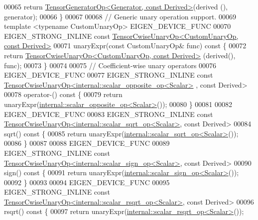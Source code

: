 \begin{DoxyCode}
00065       \textcolor{keywordflow}{return} \hyperlink{class_eigen_1_1_tensor_generator_op}{TensorGeneratorOp<Generator, const Derived>}(derived
      (), generator);
00066     \}
00067 
00068     \textcolor{comment}{// Generic unary operation support.}
00069     \textcolor{keyword}{template} <\textcolor{keyword}{typename} CustomUnaryOp> EIGEN\_DEVICE\_FUNC
00070     EIGEN\_STRONG\_INLINE \textcolor{keyword}{const} \hyperlink{class_eigen_1_1_tensor_cwise_unary_op}{TensorCwiseUnaryOp<CustomUnaryOp, const Derived>}
00071     unaryExpr(\textcolor{keyword}{const} CustomUnaryOp& func)\textcolor{keyword}{ const }\{
00072       \textcolor{keywordflow}{return} \hyperlink{class_eigen_1_1_tensor_cwise_unary_op}{TensorCwiseUnaryOp<CustomUnaryOp, const Derived>}
      (derived(), func);
00073     \}
00074 
00075     \textcolor{comment}{// Coefficient-wise unary operators}
00076     EIGEN\_DEVICE\_FUNC
00077     EIGEN\_STRONG\_INLINE \textcolor{keyword}{const} 
      \hyperlink{class_eigen_1_1_tensor_cwise_unary_op}{TensorCwiseUnaryOp<internal::scalar\_opposite\_op<Scalar>}
      , \textcolor{keyword}{const} Derived>
00078     operator-()\textcolor{keyword}{ const }\{
00079       \textcolor{keywordflow}{return} unaryExpr(\hyperlink{struct_eigen_1_1internal_1_1scalar__opposite__op}{internal::scalar\_opposite\_op<Scalar>}());
00080     \}
00081 
00082     EIGEN\_DEVICE\_FUNC
00083     EIGEN\_STRONG\_INLINE \textcolor{keyword}{const} 
      \hyperlink{class_eigen_1_1_tensor_cwise_unary_op}{TensorCwiseUnaryOp<internal::scalar\_sqrt\_op<Scalar>}, \textcolor{keyword}{
      const} Derived>
00084     sqrt()\textcolor{keyword}{ const }\{
00085       \textcolor{keywordflow}{return} unaryExpr(\hyperlink{struct_eigen_1_1internal_1_1scalar__sqrt__op}{internal::scalar\_sqrt\_op<Scalar>}());
00086     \}
00087 
00088     EIGEN\_DEVICE\_FUNC
00089     EIGEN\_STRONG\_INLINE \textcolor{keyword}{const} 
      \hyperlink{class_eigen_1_1_tensor_cwise_unary_op}{TensorCwiseUnaryOp<internal::scalar\_sign\_op<Scalar>}, \textcolor{keyword}{
      const} Derived>
00090     sign()\textcolor{keyword}{ const }\{
00091       \textcolor{keywordflow}{return} unaryExpr(\hyperlink{struct_eigen_1_1internal_1_1scalar__sign__op}{internal::scalar\_sign\_op<Scalar>}());
00092     \}
00093 
00094     EIGEN\_DEVICE\_FUNC
00095     EIGEN\_STRONG\_INLINE \textcolor{keyword}{const} 
      \hyperlink{class_eigen_1_1_tensor_cwise_unary_op}{TensorCwiseUnaryOp<internal::scalar\_rsqrt\_op<Scalar>}, \textcolor{keyword}{
      const} Derived>
00096     rsqrt()\textcolor{keyword}{ const }\{
00097       \textcolor{keywordflow}{return} unaryExpr(\hyperlink{struct_eigen_1_1internal_1_1scalar__rsqrt__op}{internal::scalar\_rsqrt\_op<Scalar>}());

\end{DoxyCode}
